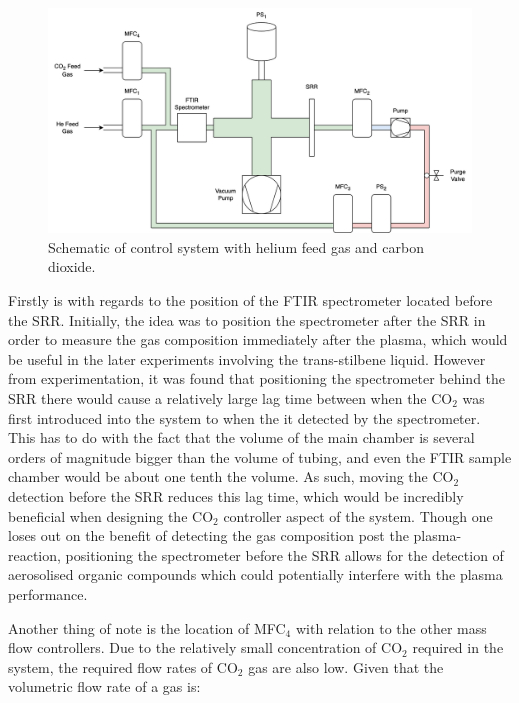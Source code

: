\begin{figure}[h!]
	\centering
	\includegraphics[width=\linewidth]{chapter_5/figures/He_CO2_control_system.png}
	\caption{Schematic of control system with helium feed gas and carbon dioxide.}
	\label{fig:He_CO2_control_system}
\end{figure}


Firstly is with regards to the position of the FTIR spectrometer located before the SRR. Initially, the idea was to position the spectrometer after the SRR in order to measure the gas composition immediately after the plasma, which would be useful in the later experiments involving the trans-stilbene liquid. However from experimentation, it was found that positioning the spectrometer behind the SRR there would cause a relatively large lag time between when the CO$_2$ was first introduced into the system to when the it detected by the spectrometer. This has to do with the fact that the volume of the main chamber is several orders of magnitude bigger than the volume of tubing, and even the FTIR sample chamber would be about one tenth the volume. As such, moving the CO$_2$ detection before the SRR reduces this lag time, which would be incredibly beneficial when designing the CO$_2$ controller aspect of the system. Though one loses out on the benefit of detecting the gas composition post the plasma-reaction, positioning the spectrometer before the SRR allows for the detection of aerosolised organic compounds which could potentially interfere with the plasma performance.


Another thing of note is the location of MFC$_4$ with relation to the other mass flow controllers. Due to the relatively small concentration of CO$_2$ required in the system, the required flow rates of CO$_2$ gas are also low. Given that the volumetric flow rate of a gas is:

